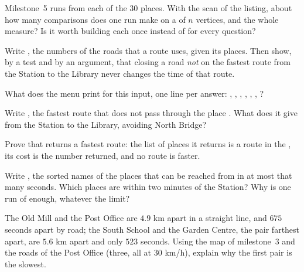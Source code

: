 \begin{exercise}[$\star\star$]\label{exo:g12:project-route-planner:9}
Milestone~5 runs  from each of the $30$ places. With the scan of the listing, about how many
comparisons does one run make on a  of $n$ vertices, and the whole measure? Is it worth building each  once
instead of for every question?
\end{exercise}

\begin{exercise}[$\star\star$]\label{exo:g12:project-route-planner:10}
Write , the numbers of the roads that a route uses, given its places. Then show, by a
test and by an argument, that closing a road \emph{not} on the fastest route from the Station to the Library never
changes the time of that route.
\end{exercise}

\begin{exercise}[$\star\star$]\label{exo:g12:project-route-planner:11}
What does the menu print for this input, one line per answer: , , , ,
, , ?
\end{exercise}

\begin{exercise}[$\star\star\star$]\label{exo:g12:project-route-planner:12}
Write , the fastest route that does not pass through the place
. What does it give from the Station to the Library, avoiding North Bridge?
\end{exercise}

\begin{exercise}[$\star\star\star$]\label{exo:g12:project-route-planner:13}
Prove that  returns a fastest route: the list of places it returns is a route in the , its cost is the
number returned, and no route is faster.
\end{exercise}

\begin{exercise}[$\star\star\star$]\label{exo:g12:project-route-planner:14}
Write , the sorted names of the places that can be reached from  in
at most that many seconds. Which places are within two minutes of the Station? Why is one run of 
enough, whatever the limit?
\end{exercise}

\begin{exercise}[$\star\star\star$]\label{exo:g12:project-route-planner:15}
The Old Mill and the Post Office are $4.9$ km apart in a straight line, and $675$ seconds apart by road; the South
School and the Garden Centre, the pair farthest apart, are $5.6$ km apart and only $523$ seconds. Using the map of
milestone~3 and the roads of the Post Office (three, all at $30$ km/h), explain why the first pair is the slowest.
\end{exercise}
